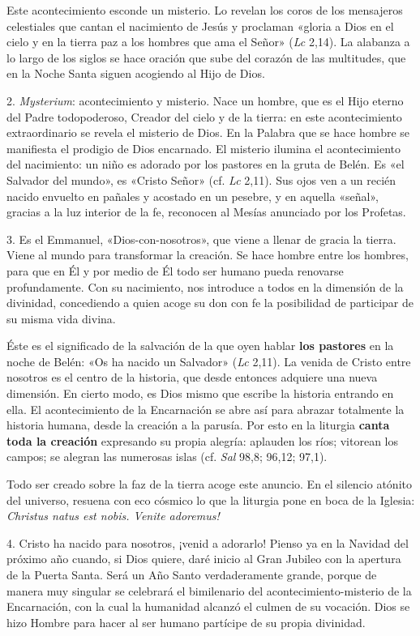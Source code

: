 \documentclass[]{article}
\begin{document}
Este acontecimiento esconde un misterio. Lo revelan los coros de los
mensajeros celestiales que cantan el nacimiento de Jesús y proclaman
«gloria a Dios en el cielo y en la tierra paz a los hombres que ama el
Señor» (\emph{Lc} 2,14). La alabanza a lo largo de los siglos se hace
oración que sube del corazón de las multitudes, que en la Noche Santa
siguen acogiendo al Hijo de Dios.

2. \emph{Mysterium}: acontecimiento y misterio. Nace un hombre, que es
el Hijo eterno del Padre todopoderoso, Creador del cielo y de la tierra:
en este acontecimiento extraordinario se revela el misterio de Dios. En
la Palabra que se hace hombre se manifiesta el prodigio de Dios
encarnado. El misterio ilumina el acontecimiento del nacimiento: un niño
es adorado por los pastores en la gruta de Belén. Es «el Salvador del
mundo», es «Cristo Señor» (cf. \emph{Lc} 2,11). Sus ojos ven a un recién
nacido envuelto en pañales y acostado en un pesebre, y en aquella
«señal», gracias a la luz interior de la fe, reconocen al Mesías
anunciado por los Profetas.

3. Es el Emmanuel, «Dios-con-nosotros», que viene a llenar de gracia la
tierra. Viene al mundo para transformar la creación. Se hace hombre
entre los hombres, para que en Él y por medio de Él todo ser humano
pueda renovarse profundamente. Con su nacimiento, nos introduce a todos
en la dimensión de la divinidad, concediendo a quien acoge su don con fe
la posibilidad de participar de su misma vida divina.

Éste es el significado de la salvación de la que oyen hablar \textbf{los
pastores} en la noche de Belén: «Os ha nacido un Salvador» (\emph{Lc}
2,11). La venida de Cristo entre nosotros es el centro de la historia,
que desde entonces adquiere una nueva dimensión. En cierto modo, es Dios
mismo que escribe la historia entrando en ella. El acontecimiento de la
Encarnación se abre así para abrazar totalmente la historia humana,
desde la creación a la parusía. Por esto en la liturgia \textbf{canta
toda la creación} expresando su propia alegría: aplauden los ríos;
vitorean los campos; se alegran las numerosas islas (cf. \emph{Sal}
98,8; 96,12; 97,1).

Todo ser creado sobre la faz de la tierra acoge este anuncio. En el
silencio atónito del universo, resuena con eco cósmico lo que la
liturgia pone en boca de la Iglesia: \emph{Christus natus est nobis.
Venite adoremus!}

4. Cristo ha nacido para nosotros, ¡venid a adorarlo! Pienso ya en la
Navidad del próximo año cuando, si Dios quiere, daré inicio al Gran
Jubileo con la apertura de la Puerta Santa. Será un Año Santo
verdaderamente grande, porque de manera muy singular se celebrará el
bimilenario del acontecimiento-misterio de la Encarnación, con la cual
la humanidad alcanzó el culmen de su vocación. Dios se hizo Hombre para
hacer al ser humano partícipe de su propia divinidad.
\end{document}
